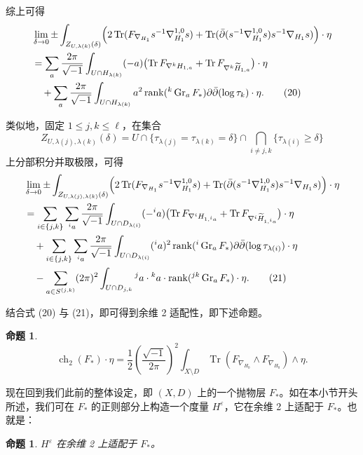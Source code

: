 \documentclass[12pt,a4paper]{article}
\newtheorem{proposition}[theorem]{命题}
\newcommand{\ch}{\operatorname{ch}}
\newcommand{\rank}{\operatorname{rank}}
\newcommand{\Tr}{\operatorname{Tr}}
\newcommand{\Gr}{\operatorname{Gr}}
\begin{document}
综上可得
\begin{align}
&\lim_{\delta\to 0}
\pm
\int_{Z_{U,\lambda(k)}(\delta)}
\Bigl(
2\Tr(F_{\nabla_{H_1}}s^{-1}\nabla^{1,0}_{H_1}s)
+
\Tr(\bar\partial(s^{-1}\nabla^{1,0}_{H_1}s)s^{-1}\nabla_{H_1}s)
\Bigr)\cdot \eta
\nonumber\\
&=
\sum_a \frac{2\pi}{\sqrt{-1}}
\int_{U\cap H_{\lambda(k)}}
(-a)\bigl(
\Tr F_{\nabla^kH_{1,a}}
+
\Tr F_{\nabla^k\widetilde H_{1,a}}
\bigr)\cdot \eta
\nonumber\\
&\quad
+
\sum_a \frac{2\pi}{\sqrt{-1}}
\int_{U\cap H_{\lambda(k)}}
a^2\rank({}^k\Gr_aF_*)\partial\bar\partial(\log\tau_k)\cdot \eta. \tag{20}
\end{align}

类似地，固定 \(1\le j,k\le \ell\)，在集合
\[
Z_{U,\lambda(j),\lambda(k)}(\delta)
=
U\cap\{\tau_{\lambda(j)}=\tau_{\lambda(k)}=\delta\}\cap
\bigcap_{i\ne j,k}\{\tau_{\lambda(i)}\ge \delta\}
\]
上分部积分并取极限，可得
\begin{align}
&\lim_{\delta\to 0}
\pm\int_{Z_{U,\lambda(j),\lambda(k)}(\delta)}
\Bigl(
2\Tr(F_{\nabla_{H_1}}s^{-1}\nabla^{1,0}_{H_1}s)
+
\Tr(\bar\partial(s^{-1}\nabla^{1,0}_{H_1}s)s^{-1}\nabla_{H_1}s)
\Bigr)\cdot \eta
\nonumber\\
&=
\sum_{i\in\{j,k\}}\sum_{{}^ia}
\frac{2\pi}{\sqrt{-1}}
\int_{U\cap D_{\lambda(i)}}
(-{}^ia)\bigl(
\Tr F_{\nabla^iH_{1,{}^ia}}
+
\Tr F_{\nabla^i\widetilde H_{1,{}^ia}}
\bigr)\cdot \eta
\nonumber\\
&\quad
+
\sum_{i\in\{j,k\}}\sum_{{}^ia}
\frac{2\pi}{\sqrt{-1}}
\int_{U\cap D_{\lambda(i)}}
({}^ia)^2\rank({}^i\Gr_aF_*)\partial\bar\partial(\log\tau_{\lambda(i)})\cdot \eta
\nonumber\\
&\quad
-
\sum_{a\in S^{(j,k)}}
(2\pi)^2
\int_{U\cap D_{j,k}}
{}^ja\cdot {}^ka\cdot \rank({}^{jk}\Gr_aF_*)\cdot \eta. \tag{21}
\end{align}

结合式 (20) 与 (21)，即可得到余维 2 适配性，即下述命题。

\begin{proposition}
\[
\ch_2(F_*)\cdot \eta
=
\frac12\left(\frac{\sqrt{-1}}{2\pi}\right)^2
\int_{X\setminus D}
\Tr(F_{\nabla_{H_0}}\wedge F_{\nabla_{H_0}})\wedge \eta.
\]
\end{proposition}

现在回到我们此前的整体设定，即 \((X,D)\) 上的一个抛物层 \(F_*\)。如在本小节开头所述，我们可在 \(F_*\) 的正则部分上构造一个度量 \(H^\varepsilon\)，它在余维 2 上适配于 \(F_*\)。也就是：

\begin{proposition}
\(H^\varepsilon\) 在余维 2 上适配于 \(F_*\)。
\end{proposition}
\end{document}
